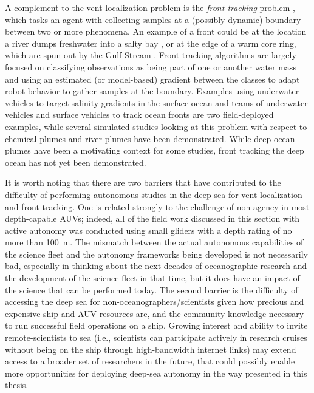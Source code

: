 A complement to the vent localization problem is the \emph{front tracking} problem  \autocite{chen2019odor}, which tasks an agent with collecting samples at a (possibly dynamic) boundary between two or more phenomena. An example of a front could be at the location a river dumps freshwater into a salty bay \autocite{mcclimans1988estuarine}, or at the edge of a warm core ring, which are spun out by the Gulf Stream \autocite{cushman1985oscillations}. Front tracking algorithms are largely focused on classifying observations as being part of one or another water mass and using an estimated (or model-based) gradient between the classes to adapt robot behavior to gather samples at the boundary. Examples using underwater vehicles to target salinity gradients in the surface ocean \autocite{belkin2018new} and teams of underwater vehicles and surface vehicles to track ocean fronts \autocite{mccammon2021ocean} are two field-deployed examples, while several simulated studies looking at this problem with respect to chemical plumes \autocite{wang2019dynamic,li2014multi} and river plumes \autocite{teixeira20213d} have been demonstrated. While deep ocean plumes have been a motivating context for some studies, front tracking the deep ocean has not yet been demonstrated.

It is worth noting that there are two barriers that have contributed to the difficulty of performing autonomous studies in the deep sea for vent localization and front tracking. One is related strongly to the challenge of non-agency in most depth-capable AUVs; indeed, all of the field work discussed in this section with active autonomy was conducted using small gliders with a depth rating of no more than \SI{100}{\meter}. The mismatch between the actual autonomous capabilities of the science fleet and the autonomy frameworks being developed is not necessarily bad, especially in thinking about the next decades of oceanographic research and the development of the science fleet in that time, but it does have an impact of the science that can be performed today. The second barrier is the difficulty of accessing the deep sea for non-oceanographers/scientists given how precious and expensive ship and AUV resources are, and the community knowledge necessary to run successful field operations on a ship. Growing interest and ability to invite remote-scientists to sea (i.e., scientists can participate actively in research cruises without being on the ship through high-bandwidth internet links) may extend access to a broader set of researchers in the future, that could possibly enable more opportunities for deploying deep-sea autonomy in the way presented in this thesis.  


